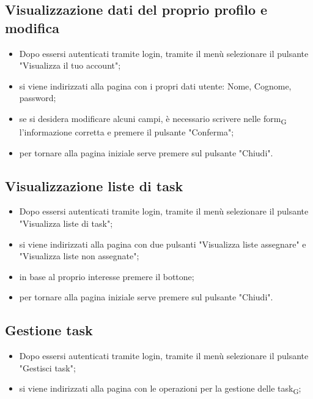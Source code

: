 \subsection{Visualizzazione dati del proprio profilo e modifica}
\begin{itemize}
    \item Dopo essersi autenticati tramite login, tramite il menù selezionare il pulsante "Visualizza il tuo account";
    \item si viene indirizzati alla pagina con i propri dati utente: Nome, Cognome, password;
    \item se si desidera modificare alcuni campi, è necessario scrivere nelle form\textsubscript{G} l'informazione corretta e premere il pulsante "Conferma";
    \item per tornare alla pagina iniziale serve premere sul pulsante "Chiudi".
\end{itemize}

\subsection{Visualizzazione liste di task}
\begin{itemize}
    \item Dopo essersi autenticati tramite login, tramite il menù selezionare il pulsante "Visualizza liste di task";
    \item si viene indirizzati alla pagina con due pulsanti "Visualizza liste assegnare" e "Visualizza liste non assegnate";
    \item in base al proprio interesse premere il bottone;
    \item per tornare alla pagina iniziale serve premere sul pulsante "Chiudi".
\end{itemize}

\subsection{Gestione task}
\begin{itemize}
    \item Dopo essersi autenticati tramite login, tramite il menù selezionare il pulsante "Gestisci task";
    \item si viene indirizzati alla pagina con le operazioni per la gestione delle task\textsubscript{G};
\end{itemize}

